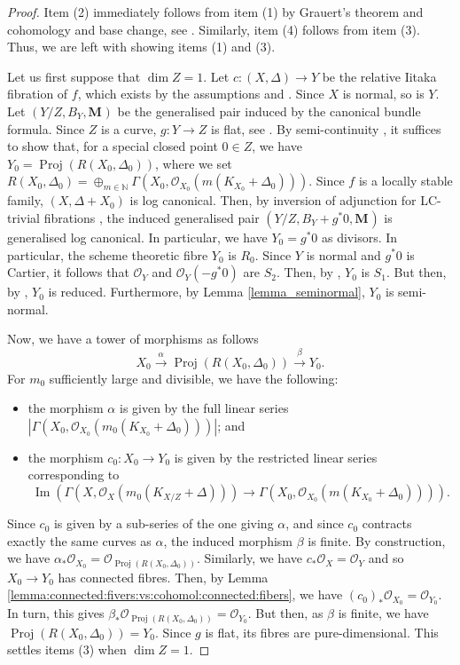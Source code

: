 \documentclass[12pt]{amsart}
\theoremstyle{plain}
\theoremstyle{definition}
\def\Proj{\operatorname{Proj}}
\def\dim{\operatorname{dim}}
\def\im{\operatorname{Im}}
\def\rar{\rightarrow}
\def\bM#1.{\mathbf{M}_{#1}}
\def\K#1.{K_{#1}}
\def\subs#1.{_{#1}}
\begin{document}
\begin{proof}
Item (2) immediately follows from item (1) by Grauert's theorem and cohomology 
and base change, see \cite[Corollary III.12.9 and Theorem III.12.11]{Hartshorne77}.
Similarly, item (4) follows from item (3).
Thus, we are left with showing items (1) and (3).


Let us first suppose that $\dim Z = 1$.
Let $c \colon (X,\Delta) \rar Y$ be the relative Iitaka fibration of $f$, which exists by the assumptions and \cite{HX11}.
Since $X$ is normal, so is $Y$.
Let $(Y/Z,B_Y,\bM.)$ be the generalised pair induced by the canonical bundle formula.
Since $Z$ is a curve, $g \colon Y \rar Z$ is flat, see \cite[Proposition III.9.7]{Hartshorne77}.
By semi-continuity \cite[Theorem III.12.8]{Hartshorne77}, it suffices to show that, for a special closed point $0 \in Z$, we have $Y_0 = \Proj(R(X_0,\Delta_0))$, where we set $R(X_0,\Delta_0)=\oplus_{m \in \mathbb N}\Gamma (X_0,\mathcal{O}\subs X_0.(m(\K X_0. + \Delta_0)))$.
Since $f$ is a locally stable family, $(X,\Delta+X_0)$ is log canonical.
Then, by inversion of adjunction for LC-trivial fibrations \cite[Theorem 3.1]{Ambro04}, the induced generalised pair $(Y/Z,B_Y+g^*0,\bM.)$ is generalised log canonical.
In particular, we have $Y_0=g^*0$ as divisors.
In particular, the scheme theoretic fibre $Y_0$ is $R_0$.
Since $Y$ is normal and $g^*0$ is Cartier, it follows that $\mathcal{O}_Y$ and $\mathcal{O}_Y(-g^*0)$ are $S_2$.
Then, by \cite[Corollary 2.61]{Kollar13}, $Y_0$ is $S_1$.
But then, by \cite[Tag 0344]{stacks-project}, $Y_0$ is reduced.
Furthermore, by Lemma \ref{lemma_seminormal}, $Y_0$ is semi-normal.

Now, we have a tower of morphisms as follows
\[
X_0 \xrightarrow{\alpha} \Proj(R(X_0,\Delta_0)) \xrightarrow{\beta} Y_0.
\]
For $m_0$ sufficiently large and divisible, we have the following:
\begin{itemize}
    \item the morphism $\alpha$ is given by the full linear series $|\Gamma (X_0,\mathcal{O}\subs X_0.(m_0(\K X_0. + \Delta_0)))|$; and
    \item the morphism $c_0 \colon X_0 \rar Y_0$ is given by the restricted linear series corresponding to
    \begin{equation} \label{eq_restriction}
    \im  (\Gamma (X,\mathcal{O}\subs X.(m_0(\K X/Z. + \Delta))) \rar \Gamma (X_0,\mathcal{O}\subs X_0.(m(\K X_0. + \Delta_0)))) .
    \end{equation}
    \end{itemize}
Since $c_0$ is given by a sub-series of the one giving $\alpha$, and since $c_0$ contracts exactly the same curves
as $\alpha$, the induced morphism $\beta$ is finite.
By construction, we have $\alpha_* \mathcal{O}\subs X_0. = \mathcal{O}_{\Proj(R(X_0,\Delta_0))}$.
Similarly, we have $c_* \mathcal{O}_X = \mathcal{O}_Y$ and so $X_0 \rar Y_0$ has connected fibres.
Then, by Lemma \ref{lemma:connected:fivers:vs:cohomol:connected:fibers}, we have $(c_0)_*\mathcal{O}_{X_0}=\mathcal{O}_{Y_0}$.
In turn, this gives $\beta_* \mathcal{O}_{\Proj(R(X_0,\Delta_0))}=\mathcal{O}_{Y_0}$.
But then, as $\beta$ is finite, we have $\Proj(R(X_0,\Delta_0))=Y_0$.
Since $g$ is flat, its fibres are pure-dimensional.
This settles items (3) when $\dim Z = 1$.


\end{proof}
\end{document}
